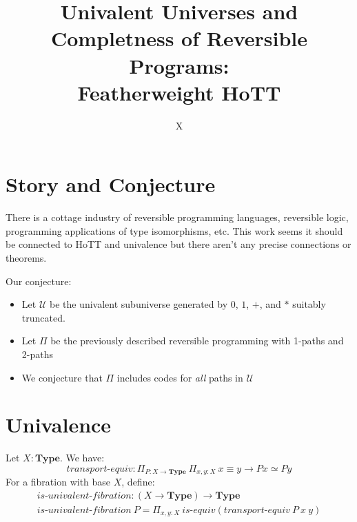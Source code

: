 \documentclass[format=acmlarge,review,natbib]{acmart}
\newcommand{\Typ}{\mathbf{Type}}
\begin{document}
\title{Univalent Universes and Completness of Reversible Programs: \\
  Featherweight HoTT}

\author{X}

\begin{abstract}
\end{abstract}

\maketitle

\section{Story and Conjecture}

There is a cottage industry of reversible programming languages, reversible logic, programming applications of type isomorphisms, etc. This work seems it should be connected to HoTT and univalence but there aren't any precise connections or theorems.

Our conjecture:

\begin{itemize}
\item Let $\mathcal{U}$ be the univalent subuniverse generated by $0$, $1$, $+$,
  and $*$ suitably truncated.
\item Let $\Pi$ be the previously  described reversible programming with 1-paths and 2-paths
\item We conjecture that $\Pi$ includes codes for \emph{all} paths in $\mathcal{U}$
\end{itemize}

\section{Univalence}

Let $X : \Typ$. We have:
\[
\textit{transport-equiv} : \Pi_{P : X \to \Typ}~ \Pi_{x,y:X}~
    x \equiv y  \to P x \simeq P y
\]
For a fibration with base $X$, define:
\[\begin{array}{l}
\textit{is-univalent-fibration} : (X \to \Typ) \to \Typ \\
\textit{is-univalent-fibration}~P =
    \Pi_{x,y:X}~\textit{is-equiv} (\textit{transport-equiv}~P~x~y)
\end{array}\]
\end{document}
